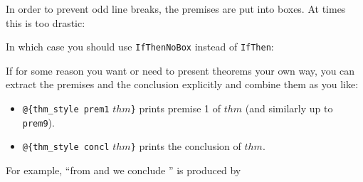 \begin{isabellebody}
\begin{isamarkuptext}
In order to prevent odd line breaks, the premises are put into boxes.
At times this is too drastic:
\begin{theorem}
\end{theorem}
In which case you should use \texttt{IfThenNoBox} instead of
\texttt{IfThen}:
\begin{theorem}
\end{theorem}%
\end{isamarkuptext}%
\isamarkuptrue%
%
\isamarkuptrue%
%
\begin{isamarkuptext}%
If for some reason you want or need to present theorems your
own way, you can extract the premises and the conclusion explicitly
and combine them as you like:
\begin{itemize}
\item \verb!@!\verb!{thm_style prem1! $thm$\verb!}!
prints premise 1 of $thm$ (and similarly up to \texttt{prem9}).
\item \verb!@!\verb!{thm_style concl! $thm$\verb!}!
prints the conclusion of $thm$.
\end{itemize}
For example, ``from  and
 we conclude ''
is produced by

\end{isamarkuptext}
\end{isabellebody}
